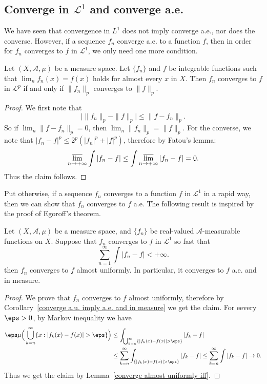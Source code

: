 \subsection{Converge in $\mathcal{L}^1$ and converge a.e.}
We have seen that convergence in $L^1$ does not imply converge a.e., nor does the converse. However, if a sequence $f_n$ converge a.e. to a function $f$, then in order for $f_n$ converges to $f$ in $\mathcal{L}^1$, we only need one more condition.
\begin{theorem}\label{converge a.e. to converge L^1 iff}
Let $(X,\mathcal{A},\mu)$ be a measure space. Let $\{f_n\}$ and $f$ be integrable functions such that $\lim_nf_n(x)=f(x)$ holds for almost every $x$ in $X$. Then $f_n$ converges to $f$ in $\mathcal{L}^p$ if and only if $\|f_n\|_p$ converges to $\|f\|_p$.
\end{theorem}
\begin{proof}
We first note that
\[\big|\|f_n\|_p-\|f\|_p\big|\leq\|f-f_n\|_p.\]
So if $\lim_n\|f-f_n\|_p=0$, then $\lim_n\|f_n\|_p=\|f\|_p$. For the converse, we note that $|f_n-f|^p\leq 2^p(|f_n|^p+|f|^p)$, therefore by Fatou's lemma:
\[\varlimsup_{n\to+\infty}\int|f_n-f|\leq\int\varlimsup_{n\to+\infty}|f_n-f|=0.\]
Thus the claim follows.
\end{proof}
Put otherwise, if a sequence $f_n$ converges to a function $f$ in $\mathcal{L}^1$ in a rapid way, then we can show that $f_n$ converges to $f$ a.e. The following result is inspired by the proof of Egoroff's theorem.
\begin{proposition}\label{converge in L^1 diff seires imply converge a.e.}
Let $(X,\mathcal{A},\mu)$ be a measure space, and $\{f_n\}$ be real-valued $\mathcal{A}$-measurable functions on $X$. Suppose that $f_n$ converges to $f$ in $\mathcal{L}^1$ so fast that
\[\sum_{n=1}^{\infty}\int|f_n-f|<+\infty.\]
then $f_n$ converges to $f$ almost uniformly. In particular, it converges to $f$ a.e. and in measure.
\end{proposition}
\begin{proof}
We prove that $f_n$ converges to $f$ almost uniformly, therefore by Corollary~\ref{converge a.u. imply a.e. and in measure} we get the claim. For eevery $\eps>0$, by Markov inequality we have
\begin{align*}
\eps\mu\Big(\bigcup_{k=n}^{\infty}\{x:|f_k(x)-f(x)|>\eps\}\Big)&\leq\int_{\bigcup_{k=n}^{\infty}\{|f_k(x)-f(x)|>\eps\}}|f_k-f|\\
&\leq\sum_{k=n}^{\infty}\int_{\{|f_k(x)-f(x)|>\eps\}}|f_k-f|\leq\sum_{k=n}^{\infty}\int|f_k-f|\to 0.
\end{align*}
Thus we get the claim by Lemma~\ref{converge almost uniformly iff}.
\end{proof}
